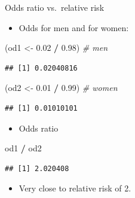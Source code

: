 \documentclass[
  ignorenonframetext,
]{beamer}
\newenvironment{Shaded}{\begin{snugshade}}{\end{snugshade}}
\newcommand{\CommentTok}[1]{\textcolor[rgb]{0.56,0.35,0.01}{\textit{#1}}}
\newcommand{\FloatTok}[1]{\textcolor[rgb]{0.00,0.00,0.81}{#1}}
\newcommand{\NormalTok}[1]{#1}
\newcommand{\OperatorTok}[1]{\textcolor[rgb]{0.81,0.36,0.00}{\textbf{#1}}}
\newcommand{\StringTok}[1]{\textcolor[rgb]{0.31,0.60,0.02}{#1}}
\providecommand{\tightlist}{%
  \setlength{\itemsep}{0pt}\setlength{\parskip}{0pt}}
\begin{document}
\begin{frame}[fragile]{Odds ratio vs.~relative risk}
\protect\hypertarget{odds-ratio-vs.-relative-risk}{}

\begin{itemize}
\tightlist
\item
  Odds for men and for women:
\end{itemize}

\begin{Shaded}
\begin{Highlighting}[]
\NormalTok{(od1 <-}\StringTok{ }\FloatTok{0.02} \OperatorTok{/}\StringTok{ }\FloatTok{0.98}\NormalTok{) }\CommentTok{# men}
\end{Highlighting}
\end{Shaded}

\begin{verbatim}
## [1] 0.02040816
\end{verbatim}

\begin{Shaded}
\begin{Highlighting}[]
\NormalTok{(od2 <-}\StringTok{ }\FloatTok{0.01} \OperatorTok{/}\StringTok{ }\FloatTok{0.99}\NormalTok{) }\CommentTok{# women}
\end{Highlighting}
\end{Shaded}

\begin{verbatim}
## [1] 0.01010101
\end{verbatim}

\begin{itemize}
\tightlist
\item
  Odds ratio
\end{itemize}

\begin{Shaded}
\begin{Highlighting}[]
\NormalTok{od1 }\OperatorTok{/}\StringTok{ }\NormalTok{od2}
\end{Highlighting}
\end{Shaded}

\begin{verbatim}
## [1] 2.020408
\end{verbatim}

\begin{itemize}
\tightlist
\item
  Very close to relative risk of 2.
\end{itemize}

\end{frame}
\end{document}

